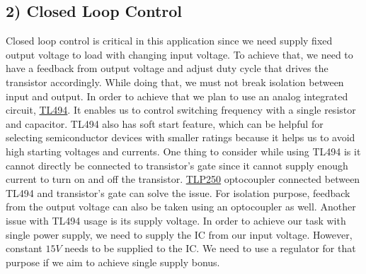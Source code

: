 \documentclass{article}
\newcommand\tab[1][1cm]{\hspace*{#1}}
\begin{document}
\subsection*{2) Closed Loop Control}
\tab Closed loop control is critical in this application since we need supply fixed output voltage to load with changing input voltage. To achieve that, we need to have a feedback from output voltage and adjust duty cycle that drives the transistor accordingly. While doing that, we must not break isolation between input and output. 
\newline \tab In order to achieve that we plan to use an analog integrated circuit, \href{http://www.ti.com/lit/ds/symlink/tl494.pdf}{TL494}. It enables us to control  switching frequency with a single resistor and capacitor. TL494 also has soft start feature, which can be helpful for selecting semiconductor devices with smaller ratings because it helps us to avoid high starting voltages and currents.
\newline \tab One thing to consider while using TL494 is it cannot directly be connected to transistor's gate since it cannot supply enough current to turn on and off the transistor. \href{https://pdf.direnc.net/upload/tlp250-datasheet.pdf}{TLP250} optocoupler connected between TL494 and transistor's gate can solve the issue. For isolation purpose, feedback from the output voltage can also be taken using an optocoupler as well. 
\newline \tab Another issue with TL494 usage is its supply voltage. In order to achieve our task with single power supply, we need to supply the IC from our input voltage. However, constant $15 V$ needs to be supplied to the IC. We need to use a regulator for that purpose if we aim to achieve single supply bonus.

\newpage
\end{document}
